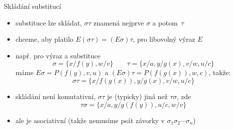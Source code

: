 \documentclass{beamer}
\begin{document}
\begin{frame}{Skládání substitucí}
    
    \pause 
    \begin{itemize}
        \item substituce lze \alert{skládat}, \alert{$\sigma\tau$} znamená nejprve $\sigma$ a potom~$\tau$\pause 
        \item chceme, aby platilo \alert{$E(\sigma\tau)=(E\sigma)\tau$}, pro libovolný výraz $E$\pause 
        \item např. pro výraz  a substituce
        $$
        \sigma=\{x/f(y),w/v\}\qquad\tau=\{x/a,y/g(x),v/w,u/c\}
        $$
        máme $E\sigma=P(f(y),v,u)$ a $(E\sigma)\tau=P(f(g(x)),w,c)$, takže:
        $$
        \sigma\tau=\{x/f(g(x)),y/g(x),v/w,u/c\}
        $$
        \item \pause skládání není komutativní, $\sigma\tau$ je (typicky) jiná než $\tau\sigma$, zde
        $$
        \tau\sigma=\{x/a,y/g(f(y)),u/c,w/v\}
        $$ 
        \item \pause ale je asociativní (takže nemusíme psát závorky v $\sigma_1\sigma_2\cdots\sigma_n$)\pause 
    \end{itemize}


\end{frame}
\end{document}
